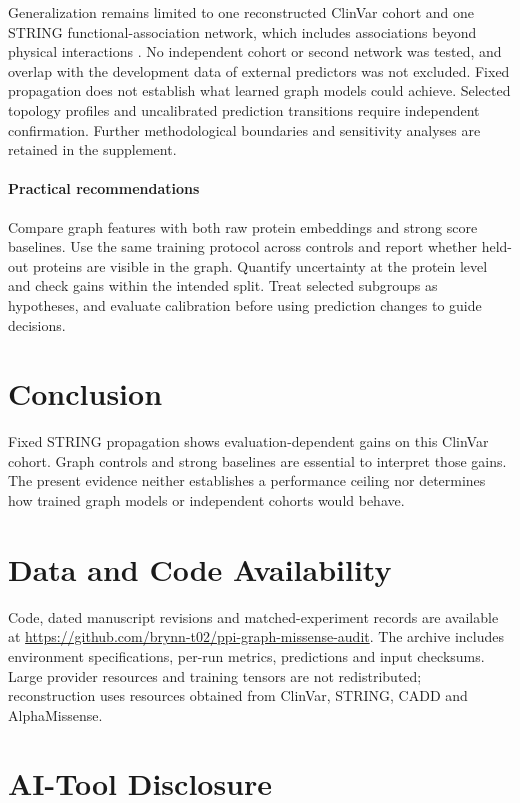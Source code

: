 \documentclass[conference]{IEEEtran}
\begin{document}
Generalization remains limited to one reconstructed ClinVar cohort and one STRING functional-association network, which includes associations beyond physical interactions \cite{Szklarczyk2023STRING}. No independent cohort or second network was tested, and overlap with the development data of external predictors was not excluded. Fixed propagation does not establish what learned graph models could achieve. Selected topology profiles and uncalibrated prediction transitions require independent confirmation. Further methodological boundaries and sensitivity analyses are retained in the supplement.

\paragraph{Practical recommendations}
Compare graph features with both raw protein embeddings and strong score baselines. Use the same training protocol across controls and report whether held-out proteins are visible in the graph. Quantify uncertainty at the protein level and check gains within the intended split. Treat selected subgroups as hypotheses, and evaluate calibration before using prediction changes to guide decisions.

\section{Conclusion}
Fixed STRING propagation shows evaluation-dependent gains on this ClinVar cohort. Graph controls and strong baselines are essential to interpret those gains. The present evidence neither establishes a performance ceiling nor determines how trained graph models or independent cohorts would behave.

\section*{Data and Code Availability}

Code, dated manuscript revisions and matched-experiment records are available at \url{https://github.com/brynn-t02/ppi-graph-missense-audit}. The archive includes environment specifications, per-run metrics, predictions and input checksums. Large provider resources and training tensors are not redistributed; reconstruction uses resources obtained from ClinVar, STRING, CADD and AlphaMissense.

\section*{AI-Tool Disclosure}
\end{document}
